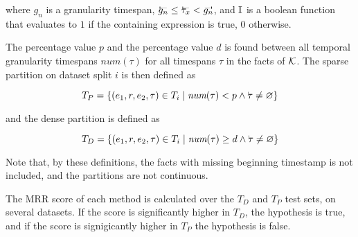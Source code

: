 where $g_n$ is a granularity timespan, $\timebegin{g_n} \leq \timebegin{\tau_x} < \timeend{g_n}$, and $\mathbb{I}$ is a boolean function that evaluates to $1$ if the containing expression is true, $0$ otherwise.

The  percentage value $p$ and the  percentage value $d$ is found between all temporal granularity timespans $\mathit{num}(\tau)$ for all timespans $\tau$ in the facts of $\mathcal{K}$. The sparse partition on dataset split $i$ is then defined as

\begin{equation}
T_P = \{ (e_1, r, e_2, \tau) \in \test_i \mid \textit{num}(\tau) < p \wedge \timebegin{\tau} \neq \varmiss \}
\end{equation}

\noindent
and the dense partition is defined as 

\begin{equation}
T_D = \{ (e_1, r, e_2, \tau) \in \test_i \mid \textit{num}(\tau) \geq d \wedge \timebegin{\tau} \neq \varmiss \}
\end{equation}

Note that, by these definitions, the facts with missing beginning timestamp is not included, and the partitions are not continuous.

The MRR score of each method is calculated over the $T_D$ and $T_P$ test sets, on several datasets. If the score is significantly higher in $T_D$, the hypothesis is true, and if the score is signigicantly higher in $T_P$ the hypothesis is false.

\begin{comment}
foreach fact in dataset
    fact_count_i_timespan(fact) >> array
done
sort(array)
median(array)
\end{comment}